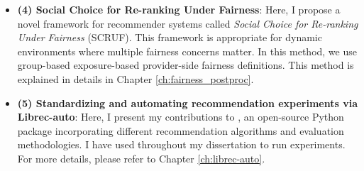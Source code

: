 \begin{itemize}
    
    \item \textbf{(4) Social Choice for Re-ranking Under Fairness}:
    Here, I propose a novel framework for recommender systems called \textit{Social Choice for Re-ranking Under Fairness} (SCRUF). This framework is appropriate for dynamic environments where multiple fairness concerns matter. In this method, we use group-based exposure-based provider-side fairness definitions. This method is explained in details in Chapter \ref{ch:fairness_postproc}.
    
    \item \textbf{(5) Standardizing and automating recommendation experiments via Librec-auto}: 
    Here, I present my contributions to \libauto{}, an open-source Python package incorporating different recommendation algorithms and evaluation methodologies. I have used \libauto{} throughout my dissertation to run experiments. For more details, please refer to Chapter \ref{ch:librec-auto}.
    
\end{itemize}














